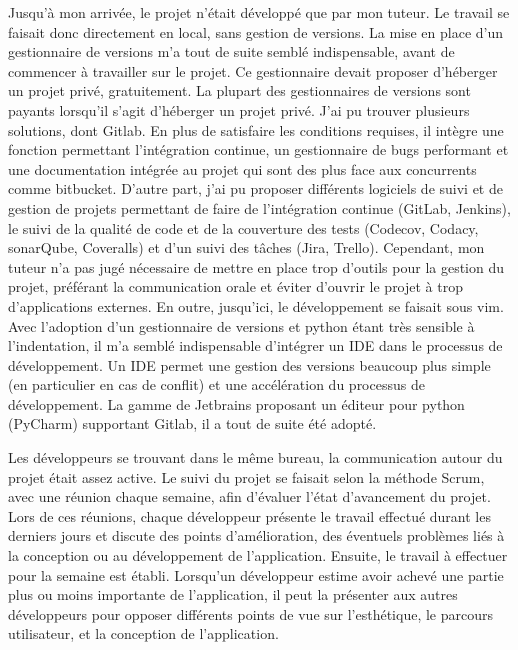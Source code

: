 \documentclass[french]{article}
\begin{document}
{Jusqu'à mon arrivée, le projet n'était développé que par mon tuteur. Le travail se faisait donc directement en local, sans gestion de versions. La mise en place d'un gestionnaire de versions m'a tout de suite semblé indispensable, avant de commencer à travailler sur le projet. Ce gestionnaire devait proposer d'héberger un projet privé, gratuitement. La plupart des gestionnaires de versions sont payants lorsqu'il s'agit d'héberger un projet privé. J'ai pu trouver plusieurs solutions, dont Gitlab. \cite{gitlab} En plus de satisfaire les conditions requises, il intègre une fonction permettant l'intégration continue, un gestionnaire de bugs performant et une documentation intégrée au projet qui sont des plus face aux concurrents comme bitbucket.
\newline{}
D'autre part, j'ai pu proposer différents logiciels de suivi et de gestion de projets permettant de faire de l'intégration continue (GitLab, Jenkins), le suivi de la qualité de code et de la couverture des tests (Codecov, Codacy, sonarQube, Coveralls) et d'un suivi des tâches (Jira, Trello). Cependant, mon tuteur n'a pas jugé nécessaire de mettre en place trop d'outils pour la gestion du projet, préférant la communication orale et éviter d'ouvrir le projet à trop d'applications externes. 
\newline{}
En outre, jusqu'ici, le développement se faisait sous vim. Avec l'adoption d'un gestionnaire de versions et python étant très sensible à l'indentation, il m'a semblé indispensable d'intégrer un IDE dans le processus de développement. Un IDE permet une gestion des versions beaucoup plus simple (en particulier en cas de conflit) et une accélération du processus de développement. La gamme de Jetbrains proposant un éditeur pour python (PyCharm) supportant Gitlab, il a tout de suite été adopté.

Les développeurs se trouvant dans le même bureau, la communication autour du projet était assez active. Le suivi du projet se faisait selon la méthode Scrum, avec une réunion chaque semaine, afin d'évaluer l'état d'avancement du projet. Lors de ces réunions, chaque développeur présente le travail effectué durant les derniers jours et discute des points d'amélioration, des éventuels problèmes liés à la conception ou au développement de l'application. Ensuite, le travail à effectuer pour la semaine est établi. Lorsqu'un développeur estime avoir achevé une partie plus ou moins importante de l'application, il peut la présenter aux autres développeurs pour opposer différents points de vue sur l'esthétique, le parcours utilisateur, et la conception de l'application.

}
\end{document}
